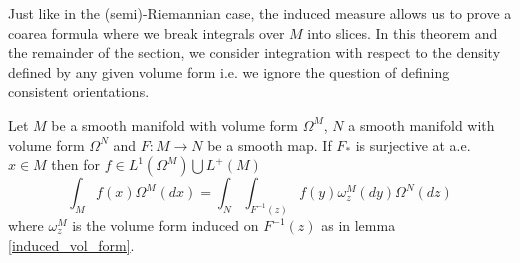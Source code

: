 Just like in the (semi)-Riemannian case, the induced measure allows us to prove a coarea formula where we break integrals over $M$ into slices. In this theorem and the remainder of the section, we consider integration with respect to the density defined by any given volume form i.e. we ignore the question of defining consistent orientations.
\begin{theorem}\label{vol_form_coarea}
Let $M$ be a smooth manifold with volume form $\Omega^M$, $N$ a smooth manifold with volume form $\Omega^N$ and $F:M\rightarrow N$ be a smooth map.  If $F_*$ is surjective at a.e. $x\in M$ then for $f\in L^1(\Omega^M)\bigcup L^+(M)$
\begin{equation}\label{coarea_formula}
\int_Mf(x) \Omega^M(dx)=\int_{N}\int_{F^{-1}(z)} f(y)\omega^M_z(dy) \Omega^N(dz)
\end{equation}
where $\omega^M_z$ is the volume form induced on $F^{-1}(z)$ as in lemma \ref{induced_vol_form}.
\end{theorem}
